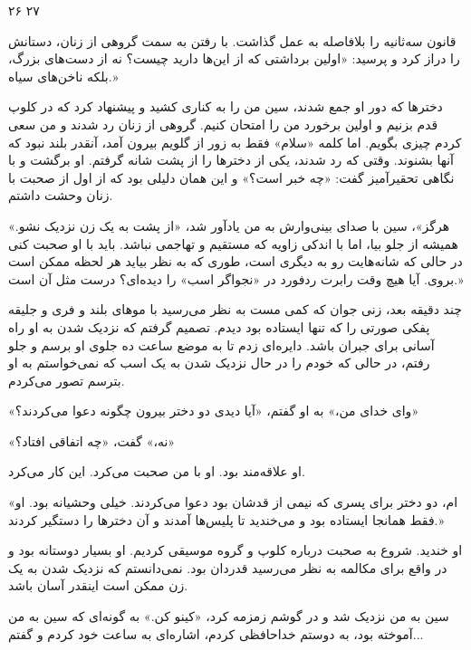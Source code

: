 ۲۶ ۲۷

قانون سه‌ثانیه را بلافاصله به عمل گذاشت. با رفتن به سمت گروهی از زنان، دستانش را دراز کرد و پرسید: «اولین برداشتی که از این‌ها دارید چیست؟ نه از دست‌های بزرگ، بلکه ناخن‌های سیاه.» 

دخترها که دور او جمع شدند، سین من را به کناری کشید و پیشنهاد کرد که در کلوپ قدم بزنیم و اولین برخورد من را امتحان کنیم. گروهی از زنان رد شدند و من سعی کردم چیزی بگویم. اما کلمه «سلام» فقط به زور از گلویم بیرون آمد، آنقدر بلند نبود که آنها بشنوند. وقتی که رد شدند، یکی از دخترها را از پشت شانه گرفتم. او برگشت و با نگاهی تحقیرآمیز گفت: «چه خبر است؟» و این همان دلیلی بود که از اول از صحبت با زنان وحشت داشتم.

«هرگز»، سین با صدای بینی‌وارش به من یادآور شد، «از پشت به یک زن نزدیک نشو. همیشه از جلو بیا، اما با اندکی زاویه که مستقیم و تهاجمی نباشد. باید با او صحبت کنی در حالی که شانه‌هایت رو به دیگری است، طوری که به نظر بیاید هر لحظه ممکن است بروی. آیا هیچ وقت رابرت ردفورد در «نجواگر اسب» را دیده‌ای؟ درست مثل آن است.»

چند دقیقه بعد، زنی جوان که کمی مست به نظر می‌رسید با موهای بلند و فری و جلیقه پفکی صورتی را که تنها ایستاده بود دیدم. تصمیم گرفتم که نزدیک شدن به او راه آسانی برای جبران باشد. دایره‌ای زدم تا به موضع ساعت ده جلوی او برسم و جلو رفتم، در حالی که خودم را در حال نزدیک شدن به یک اسب که نمی‌خواستم به او بترسم تصور می‌کردم. 

«وای خدای من،» به او گفتم، «آیا دیدی دو دختر بیرون چگونه دعوا می‌کردند؟»

«نه،» گفت، «چه اتفاقی افتاد؟»

او علاقه‌مند بود. او با من صحبت می‌کرد. این کار می‌کرد.

«ام، دو دختر برای پسری که نیمی از قدشان بود دعوا می‌کردند. خیلی وحشیانه بود. او فقط همانجا ایستاده بود و می‌خندید تا پلیس‌ها آمدند و آن دخترها را دستگیر کردند.»

او خندید. شروع به صحبت درباره کلوپ و گروه موسیقی کردیم. او بسیار دوستانه بود و در واقع برای مکالمه به نظر می‌رسید قدردان بود. نمی‌دانستم که نزدیک شدن به یک زن ممکن است اینقدر آسان باشد.

سین به من نزدیک شد و در گوشم زمزمه کرد، «کینو کن.» به گونه‌ای که سین به من آموخته بود، به دوستم خداحافظی کردم، اشاره‌‌‌‌ای به ساعت خود کردم و گفتم...
